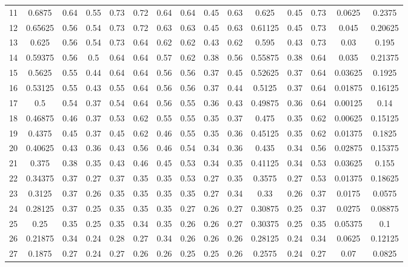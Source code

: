 \begin{appendices}
\begin{table}[!h]
{{\begin{tabular}{l||c|c|c|c|c|c|c|c|c||c|c|c||c|c}
 	 11 & 0.6875 & 0.64 & 0.55 & 0.73 & 0.72 & 0.64 & 0.64 & 0.45 & 0.63  &  0.625 & 0.45 & 0.73  &  0.0625 & 0.2375\\
 	 12 & 0.65625 & 0.56 & 0.54 & 0.73 & 0.72 & 0.63 & 0.63 & 0.45 & 0.63  &  0.61125 & 0.45 & 0.73  &  0.045 & 0.20625\\
 	 13 & 0.625 & 0.56 & 0.54 & 0.73 & 0.64 & 0.62 & 0.62 & 0.43 & 0.62  &  0.595 & 0.43 & 0.73  &  0.03 & 0.195\\
 	 14 & 0.59375 & 0.56 & 0.5 & 0.64 & 0.64 & 0.57 & 0.62 & 0.38 & 0.56  &  0.55875 & 0.38 & 0.64  &  0.035 & 0.21375\\
 	 15 & 0.5625 & 0.55 & 0.44 & 0.64 & 0.64 & 0.56 & 0.56 & 0.37 & 0.45  &  0.52625 & 0.37 & 0.64  &  0.03625 & 0.1925\\
 	 16 & 0.53125 & 0.55 & 0.43 & 0.55 & 0.64 & 0.56 & 0.56 & 0.37 & 0.44  &  0.5125 & 0.37 & 0.64  &  0.01875 & 0.16125\\
 	 17 & 0.5 & 0.54 & 0.37 & 0.54 & 0.64 & 0.56 & 0.55 & 0.36 & 0.43  &  0.49875 & 0.36 & 0.64  &  0.00125 & 0.14\\
 	 18 & 0.46875 & 0.46 & 0.37 & 0.53 & 0.62 & 0.55 & 0.55 & 0.35 & 0.37  &  0.475 & 0.35 & 0.62  &  0.00625 & 0.15125\\
 	 19 & 0.4375 & 0.45 & 0.37 & 0.45 & 0.62 & 0.46 & 0.55 & 0.35 & 0.36  &  0.45125 & 0.35 & 0.62  &  0.01375 & 0.1825\\
 	 20 & 0.40625 & 0.43 & 0.36 & 0.43 & 0.56 & 0.46 & 0.54 & 0.34 & 0.36  &  0.435 & 0.34 & 0.56  &  0.02875 & 0.15375\\
 	 21 & 0.375 & 0.38 & 0.35 & 0.43 & 0.46 & 0.45 & 0.53 & 0.34 & 0.35  &  0.41125 & 0.34 & 0.53  &  0.03625 & 0.155\\
 	 22 & 0.34375 & 0.37 & 0.27 & 0.37 & 0.35 & 0.35 & 0.53 & 0.27 & 0.35  &  0.3575 & 0.27 & 0.53  &  0.01375 & 0.18625\\
 	 23 & 0.3125 & 0.37 & 0.26 & 0.35 & 0.35 & 0.35 & 0.35 & 0.27 & 0.34  &  0.33 & 0.26 & 0.37  &  0.0175 & 0.0575\\
 	 24 & 0.28125 & 0.37 & 0.25 & 0.35 & 0.35 & 0.35 & 0.27 & 0.26 & 0.27  &  0.30875 & 0.25 & 0.37  &  0.0275 & 0.08875\\
 	 25 & 0.25 & 0.35 & 0.25 & 0.35 & 0.34 & 0.35 & 0.26 & 0.26 & 0.27  &  0.30375 & 0.25 & 0.35  &  0.05375 & 0.1\\
 	 26 & 0.21875 & 0.34 & 0.24 & 0.28 & 0.27 & 0.34 & 0.26 & 0.26 & 0.26  &  0.28125 & 0.24 & 0.34  &  0.0625 & 0.12125\\
 	 27 & 0.1875 & 0.27 & 0.24 & 0.27 & 0.26 & 0.26 & 0.25 & 0.25 & 0.26  &  0.2575 & 0.24 & 0.27  &  0.07 & 0.0825\\

\end{tabular}}}
\end{table}
\end{appendices}
